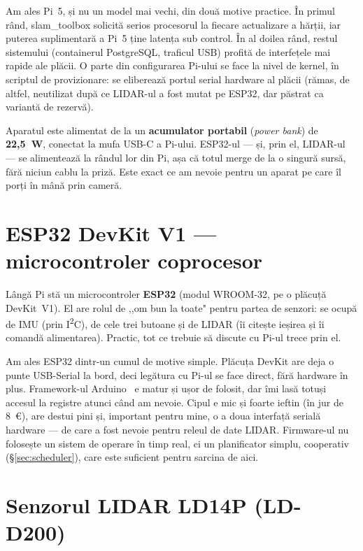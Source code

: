 \documentclass[a4paper,12pt,twoside,openany]{report}
\begin{document}
Am ales Pi~5, și nu un model mai vechi, din două motive practice. În primul
rând, slam\_toolbox solicită serios procesorul la fiecare actualizare a hărții,
iar puterea suplimentară a Pi~5 ține latența sub control. În al doilea rând,
restul sistemului (containerul PostgreSQL, traficul USB) profită de
interfețele mai rapide ale plăcii. O parte din configurarea Pi-ului se face la
nivel de kernel, în scriptul de provizionare: se eliberează portul serial
hardware al plăcii (rămas, de altfel, neutilizat după ce LIDAR-ul a fost mutat
pe ESP32, dar păstrat ca variantă de rezervă).

Aparatul este alimentat de la un \textbf{acumulator portabil} (\textit{power
bank}) de \textbf{22,5~W}, conectat la mufa USB-C a Pi-ului. ESP32-ul — și,
prin el, LIDAR-ul — se alimentează la rândul lor din Pi, așa că totul merge de
la o singură sursă, fără niciun cablu la priză. Este exact ce am nevoie pentru
un aparat pe care îl porți în mână prin cameră.

\section{ESP32 DevKit V1 — microcontroler coprocesor}
\label{sec:esp32}

Lângă Pi stă un microcontroler \textbf{ESP32} (modul WROOM-32, pe o plăcuță
DevKit~V1). El are rolul de ,,om bun la toate" pentru partea de senzori: se
ocupă de IMU (prin I\textsuperscript{2}C), de cele trei butoane și de LIDAR
(îi citește ieșirea și îi comandă alimentarea). Practic, tot ce trebuie să
discute cu Pi-ul trece prin el.

Am ales ESP32 dintr-un cumul de motive simple. Plăcuța DevKit are deja o punte
USB-Serial la bord, deci legătura cu Pi-ul se face direct, fără hardware în
plus. Framework-ul Arduino~\cite{arduinoesp32} e matur și ușor de folosit, dar
îmi lasă totuși accesul la registre atunci când am nevoie. Cipul e mic și
foarte ieftin (în jur de \SI{8}{\euro}), are destui pini și, important pentru
mine, o a doua interfață serială hardware — de care a fost nevoie pentru
releul de date LIDAR. Firmware-ul nu folosește un sistem de operare în timp
real, ci un planificator simplu, cooperativ (§\ref{sec:scheduler}), care este
suficient pentru sarcina de aici.

\section{Senzorul LIDAR LD14P (LD-D200)}
\label{sec:lidar}
\end{document}
